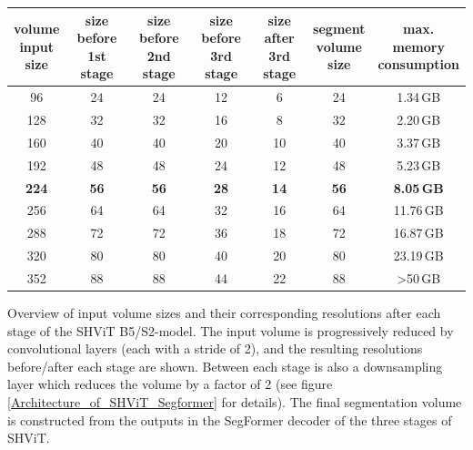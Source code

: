 \begin{center}
\begin{threeparttable}[H]
	\begin{tabular}{c|cccc|c|c}
		\toprule
		\CellWithForcedBreak{volume \\ input \\ size} & \CellWithForcedBreak{size before \\ 1st stage} & \CellWithForcedBreak{size before \\ 2nd stage} & \CellWithForcedBreak{size before \\ 3rd stage} & \CellWithForcedBreak{size after \\ 3rd stage} & \CellWithForcedBreak{segment \\ volume \\ size} & \CellWithForcedBreak{max. \\ memory \\ consumption} \\
		\midrule
		\midrule
		96 & 24 & 24 & 12 &  6 & 24 & 1.34\,GB \\
		128 & 32 & 32 & 16 &  8 & 32 & 2.20\,GB \\
		160 & 40 & 40 & 20 &  10 & 40 & 3.37\,GB \\
		192 & 48 & 48 & 24 &  12 & 48 & 5.23\,GB \\
		{\bf 224} & {\bf 56} & {\bf 56} & {\bf 28} &  {\bf 14} & {\bf 56} & {\bf 8.05\,GB} \\
		256 & 64 & 64 & 32 &  16 & 64 & 11.76\,GB \\
		288 & 72 & 72 & 36 &  18 & 72 & 16.87\,GB \\
		320 & 80 & 80 & 40 & 20 & 80 & 23.19\,GB \\
		\midrule
		352 & 88 & 88 & 44 & 22 & 88 & >50\,GB \\
		\bottomrule
	\end{tabular}
	\caption[Overview of input volume sizes and their corresponding resolutions after each stage of the SHViT B5/S2-model]{Overview of input volume sizes and their corresponding resolutions after each stage of the SHViT B5/S2-model. The input volume is progressively reduced by convolutional layers (each with a stride of 2), and the resulting resolutions before/after each stage are shown. Between each stage is also a downsampling layer which reduces the volume by a factor of 2 (see figure \ref{Architecture_of_SHViT_Segformer} for details). The final segmentation volume is constructed from the outputs in the SegFormer decoder of the three stages of SHViT.}
	\label{tab:volume_stages}	
\end{threeparttable}
\end{center}

